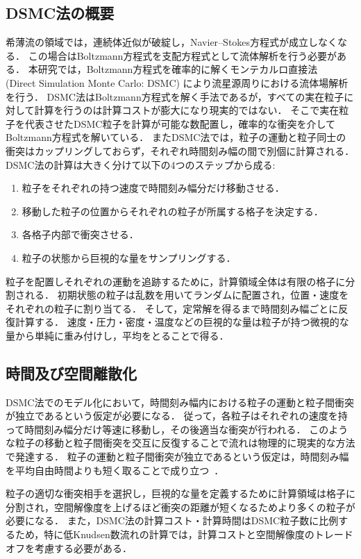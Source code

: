 \subsection{DSMC法の概要}
希薄流の領域では，連続体近似が破綻し，Navier–Stokes方程式が成立しなくなる．
この場合はBoltzmann方程式を支配方程式として流体解析を行う必要がある．
本研究では，Boltzmann方程式を確率的に解くモンテカルロ直接法~\cite{bird1994molecular} (Direct Simulation Monte Carlo: DSMC) により流星源周りにおける流体場解析を行う．
DSMC法はBoltzmann方程式を解く手法であるが，すべての実在粒子に対して計算を行うのは計算コストが膨大になり現実的ではない．
そこで実在粒子を代表させたDSMC粒子を計算が可能な数配置し，確率的な衝突を介してBoltzmann方程式を解いている．
またDSMC法では，粒子の運動と粒子同士の衝突はカップリングしておらず，それぞれ時間刻み幅の間で別個に計算される．
DSMC法の計算は大きく分けて以下の4つのステップから成る:
\begin{enumerate}
    \item 粒子をそれぞれの持つ速度で時間刻み幅分だけ移動させる．
    \item 移動した粒子の位置からそれぞれの粒子が所属する格子を決定する．
    \item 各格子内部で衝突させる．
    \item 粒子の状態から巨視的な量をサンプリングする．
\end{enumerate}
粒子を配置しそれぞれの運動を追跡するために，計算領域全体は有限の格子に分割される．
初期状態の粒子は乱数を用いてランダムに配置され，位置・速度をそれぞれの粒子に割り当てる．
そして，定常解を得るまで時間刻み幅ごとに反復計算する．
速度・圧力・密度・温度などの巨視的な量は粒子が持つ微視的な量から単純に重み付けし，平均をとることで得る．

\subsection{時間及び空間離散化}
DSMC法でのモデル化において，時間刻み幅内における粒子の運動と粒子間衝突が独立であるという仮定が必要になる．
従って，各粒子はそれぞれの速度を持って時間刻み幅分だけ等速に移動し，その後適当な衝突が行われる．
このような粒子の移動と粒子間衝突を交互に反復することで流れは物理的に現実的な方法で発達する．
粒子の運動と粒子間衝突が独立であるという仮定は，時間刻み幅を平均自由時間よりも短く取ることで成り立つ~\cite{bird1994molecular}．

粒子の適切な衝突相手を選択し，巨視的な量を定義するために計算領域は格子に分割され，空間解像度を上げるほど衝突の距離が短くなるためより多くの粒子が必要になる．
また，DSMC法の計算コスト・計算時間はDSMC粒子数に比例するため，特に低Knudsen数流れの計算では，計算コストと空間解像度のトレードオフを考慮する必要がある．

